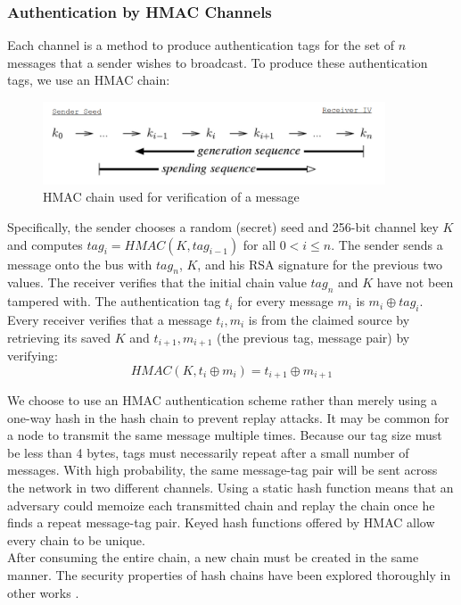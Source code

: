 \documentclass{article}
\newcommand*\xor{\mathbin{\oplus}}
\begin{document}
    \subsubsection{Authentication by HMAC Channels}
    Each channel is a method to produce authentication tags for the set of $n$ messages that a sender wishes to broadcast. To produce these authentication tags, we use an HMAC chain: \\
    
\begin{figure}[h]
  \centering
  \includegraphics[width=4in]{hchain}
  \caption {HMAC chain used for verification of a message}
\end{figure} 
    
    Specifically, the sender chooses a random (secret) seed and 256-bit channel key $K$ and computes $tag_i = HMAC(K,tag_{i-1})$ for all $0<i \leq n$. The sender sends a message onto the bus with $tag_n$, $K$, and his RSA signature for the previous two values. The receiver verifies that the initial chain value $tag_n$ and $K$ have not been tampered with. The authentication tag $t_i$ for every message $m_i$ is $m_i \xor tag_i$. Every receiver verifies that a message $t_i,m_i$ is from the claimed source by retrieving its saved $K$ and $t_{i+1},m_{i+1}$ (the previous tag, message pair) by verifying: $$HMAC(K,t_i \xor m_i) = t_{i+1} \xor m_{i+1}$$
    
    We choose to use an HMAC authentication scheme rather than merely using a one-way hash in the hash chain to prevent replay attacks. It may be common for a node to transmit the same message multiple times. Because our tag size must be less than 4 bytes, tags must necessarily repeat after a small number of messages. With high probability,  the same message-tag pair will be sent across the network in two different channels. Using a static hash function means that an adversary could memoize each transmitted chain and replay the chain once he finds a repeat message-tag pair. Keyed hash functions offered by HMAC allow every chain to be unique. \\
    
    After consuming the entire chain, a new chain must be created in the same manner. The security properties of hash chains have been explored thoroughly in other works \cite{hmacsecurity}.
    
\end{document}
